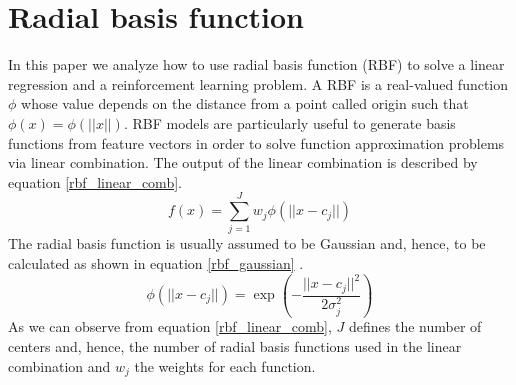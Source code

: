 \documentclass[runningheads]{llncs}
\begin{document}
\section{Radial basis function}\label{RBF}
In this paper we analyze how to use radial basis function (RBF) to
solve a linear regression and a reinforcement learning problem. A RBF
is a real-valued function $\phi$ whose value depends on the distance
from a point called origin such that $\phi(x) = \phi(||x||)$. RBF
models are particularly useful to generate basis functions from
feature vectors in order to solve function approximation problems via
linear combination. The output of the linear combination is described
by equation \ref{rbf_linear_comb}.
\begin{equation}\label{rbf_linear_comb}
  f(x) = \sum_{j=1}^{J}w_j\phi(||x-c_j||)
\end{equation}
The radial basis function is usually assumed to be Gaussian and,
hence, to be calculated as shown in equation \ref{rbf_gaussian}
\cite{rlbook}.
\begin{equation}\label{rbf_gaussian}
\phi(||x-c_j||) = \exp\left(-\frac{||x-c_j||^2}{2\sigma^2_j}\right)
\end{equation}
As we can observe from equation \ref{rbf_linear_comb}, $J$ defines the
number of centers and, hence, the number of radial basis functions used
in the linear combination and $w_j$ the weights for each function.
\end{document}
